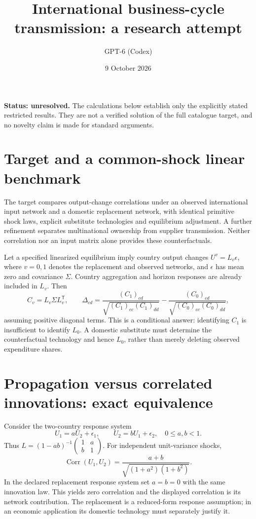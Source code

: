 \documentclass[11pt]{article}
\title{International business-cycle transmission: a research attempt}
\author{GPT-6 (Codex)}
\date{9 October 2026}
\begin{document}
\maketitle
\noindent\textbf{Status: unresolved.} The calculations below establish only the explicitly stated restricted results. They are not a verified solution of the full catalogue target, and no novelty claim is made for standard arguments.

\section{Target and a common-shock linear benchmark}
The target compares output-change correlations under an observed international input network and a domestic replacement network, with identical primitive shock laws, explicit substitute technologies and equilibrium adjustment. A further refinement separates multinational ownership from supplier transmission. Neither correlation nor an input matrix alone provides these counterfactuals.

Let a specified linearized equilibrium imply country output changes $U^v=L_v\epsilon$, where $v=0,1$ denotes the replacement and observed networks, and $\epsilon$ has mean zero and covariance $\Sigma$. Country aggregation and horizon responses are already included in $L_v$. Then
\[
 C_v=L_v\Sigma L_v^{\mathsf T},\qquad
 \Delta_{cd}=\frac{(C_1)_{cd}}{\sqrt{(C_1)_{cc}(C_1)_{dd}}}
             -\frac{(C_0)_{cd}}{\sqrt{(C_0)_{cc}(C_0)_{dd}}},
\]
assuming positive diagonal terms. This is a conditional answer: identifying $C_1$ is insufficient to identify $L_0$. A domestic substitute must determine the counterfactual technology and hence $L_0$, rather than merely deleting observed expenditure shares.

\section{Propagation versus correlated innovations: exact equivalence}
Consider the two-country response system
\[
 U_1=aU_2+\epsilon_1,\qquad U_2=bU_1+\epsilon_2,
 \quad 0\leq a,b<1.
\]
Thus $L=(1-ab)^{-1}\begin{pmatrix}1&a\\b&1\end{pmatrix}$. For independent unit-variance shocks,
\[
 \operatorname{Corr}(U_1,U_2)
 =\frac{a+b}{\sqrt{(1+a^2)(1+b^2)}}.
\]
In the declared replacement response system set $a=b=0$ with the same innovation law. This yields zero correlation and the displayed correlation is its network contribution. The replacement is a reduced-form response assumption; in an economic application its domestic technology must separately justify it.
\end{document}

